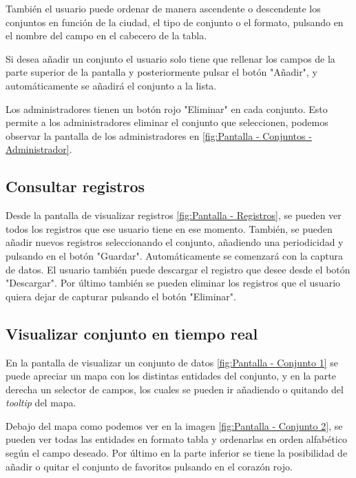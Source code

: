 También el usuario puede ordenar de manera ascendente o descendente los conjuntos en función de la ciudad, el tipo de conjunto o el formato, pulsando en el nombre del campo en el cabecero de la tabla.

Si desea añadir un conjunto el usuario solo tiene que rellenar los campos de la parte superior de  la pantalla y posteriormente pulsar el botón "Añadir", y automáticamente se añadirá el conjunto a la lista.

Los administradores tienen un botón rojo "Eliminar" en cada conjunto. Esto permite a los administradores eliminar el conjunto que seleccionen, podemos observar la pantalla de los administradores en \ref{fig:Pantalla - Conjuntos - Administrador}.

\subsection{Consultar registros}\label{consultar-registros}
Desde la pantalla de visualizar registros \ref{fig:Pantalla - Registros}, se pueden ver todos los registros que ese usuario tiene en ese momento.
También, se pueden añadir nuevos registros seleccionando el conjunto, añadiendo una periodicidad y pulsando en el botón "Guardar". Automáticamente se comenzará con la captura de datos.
El usuario también puede descargar el registro que desee desde el botón "Descargar".
Por último también se pueden eliminar los registros que el usuario quiera dejar de capturar pulsando el botón "Eliminar".

\subsection{Visualizar conjunto en tiempo real}\label{visualizar-conjunto}
En la pantalla de visualizar un conjunto de datos \ref{fig:Pantalla - Conjunto 1} se puede apreciar un mapa con los distintas entidades del conjunto, y en la parte derecha un selector de campos, los cuales se pueden ir añadiendo o quitando del \textit{tooltip} del mapa.

Debajo del mapa como podemos ver en la imagen \ref{fig:Pantalla - Conjunto 2}, se pueden ver todas las entidades en formato tabla y ordenarlas en orden alfabético según el campo deseado. 
Por último en la parte inferior se tiene la posibilidad de añadir o quitar el conjunto de favoritos pulsando en el corazón rojo.

